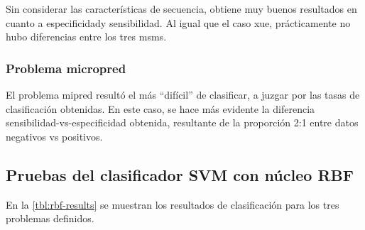 \documentclass[12pt,bibliography=oldstyle,DIV=12,parskip=half-]{scrreprt}
\begin{document}
Sin considerar las características de secuencia, obtiene muy buenos
resultados en cuanto a especificidady sensibilidad. Al igual que el
caso xue, prácticamente no hubo diferencias entre los tres msms.
%
\subsubsection{Problema micropred}
%
El problema mipred resultó el más ``difícil'' de clasificar, a juzgar
por las tasas de clasificación obtenidas. En este caso, se hace más
evidente la diferencia sensibilidad-vs-especificidad obtenida,
resultante de la proporción 2:1 entre datos negativos vs positivos.
%
%
%
\subsection{Pruebas del clasificador SVM con núcleo RBF}
%
En la \autoref{tbl:rbf-results} se muestran los resultados de
clasificación para los tres problemas definidos.
\end{document}
